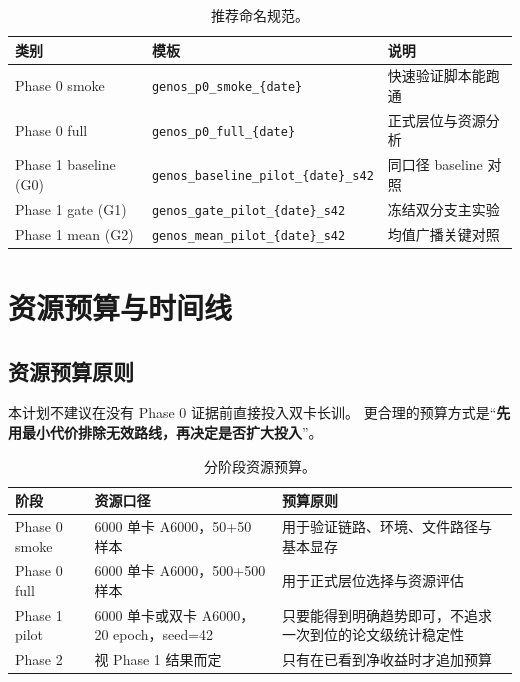\documentclass[11pt,a4paper]{ctexart}
\begin{document}
\begin{table}[H]
\centering
\small
\caption{推荐命名规范。}
\label{tab:naming}
\begin{tabularx}{\textwidth}{l l Y}
\toprule
类别 & 模板 & 说明 \\
\midrule
Phase 0 smoke & \texttt{genos\_p0\_smoke\_\{date\}} & 快速验证脚本能跑通 \\
Phase 0 full & \texttt{genos\_p0\_full\_\{date\}} & 正式层位与资源分析 \\
Phase 1 baseline (G0) & \texttt{genos\_baseline\_pilot\_\{date\}\_s42} & 同口径 baseline 对照 \\
Phase 1 gate (G1) & \texttt{genos\_gate\_pilot\_\{date\}\_s42} & 冻结双分支主实验 \\
Phase 1 mean (G2) & \texttt{genos\_mean\_pilot\_\{date\}\_s42} & 均值广播关键对照 \\
\bottomrule
\end{tabularx}
\end{table}

\section{资源预算与时间线}

\subsection{资源预算原则}

本计划不建议在没有 Phase 0 证据前直接投入双卡长训。
更合理的预算方式是“\textbf{先用最小代价排除无效路线，再决定是否扩大投入}”。

\begin{table}[H]
\centering
\small
\caption{分阶段资源预算。}
\label{tab:budget}
\begin{tabularx}{\textwidth}{l l Y}
\toprule
阶段 & 资源口径 & 预算原则 \\
\midrule
Phase 0 smoke & 6000 单卡 A6000，50+50 样本 & 用于验证链路、环境、文件路径与基本显存 \\
Phase 0 full & 6000 单卡 A6000，500+500 样本 & 用于正式层位选择与资源评估 \\
Phase 1 pilot & 6000 单卡或双卡 A6000，20 epoch，seed=42 & 只要能得到明确趋势即可，不追求一次到位的论文级统计稳定性 \\
Phase 2 & 视 Phase 1 结果而定 & 只有在已看到净收益时才追加预算 \\
\bottomrule
\end{tabularx}
\end{table}
\end{document}
